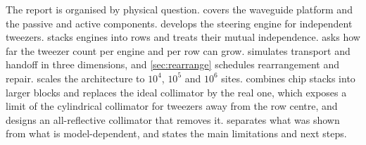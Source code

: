 The report is organised by physical question.  covers the waveguide platform and the passive
and active components.  develops the steering engine for independent tweezers.
 stacks engines into rows and treats their mutual independence.  asks how
far the tweezer count per engine and per row can grow.  simulates transport and handoff
in three dimensions, and \cref{sec:rearrange} schedules rearrangement and repair.  scales
the architecture to $10^4$, $10^5$ and $10^6$ sites.  combines chip stacks into larger
blocks and replaces the ideal collimator by the real one, which exposes a limit of the cylindrical collimator
for tweezers away from the row centre, and designs an all-reflective collimator that removes it.  separates what was shown from what is
model-dependent, and states the main limitations and next steps.
